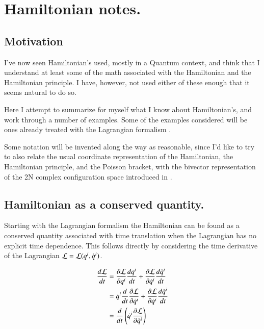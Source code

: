 

\chapter{Hamiltonian notes.}
\label{chap:hamiltonian}
{}
\date{Sept 26, 2009}

\beginArtWithToc

\section{Motivation}

I've now seen Hamiltonian's used, mostly in a Quantum context, and think that I understand at least some of the math associated with the Hamiltonian and the Hamiltonian principle.  I have, however, not used either of these enough that it seems natural to do so.

Here I attempt to summarize for myself what I know about Hamiltonian's, and work through a number of examples.  Some of the examples considered will be ones already treated with the Lagrangian formalism \cite{PJTongMf1}.

Some notation will be invented along the way as reasonable, since I'd like to try to also relate the usual coordinate representation of the Hamiltonian, the Hamiltonian principle, and the Poisson bracket, with the bivector representation of the 2N complex configuration space introduced in \cite{doran2003gap}.

\section{Hamiltonian as a conserved quantity.}

Starting with the Lagrangian formalism the Hamiltonian can be found as a conserved quantity associated with time translation when the Lagrangian has no explicit time dependence.  This follows directly by considering the time derivative of the Lagrangian $\mathcal{L} = \mathcal{L}(q^i, \dot{q}^i)$.

\begin{align*}
\frac{d\mathcal{L}}{dt} 
&= \frac{\partial {\mathcal{L}}}{\partial {q^i}} \frac{dq^i}{dt} +\frac{\partial {\mathcal{L}}}{\partial {\dot{q}^i}} \frac{d\dot{q}^i}{dt} \\
&= \dot{q}^i \frac{d}{dt}\frac{\partial {\mathcal{L}}}{\partial {\dot{q}^i}} +\frac{\partial {\mathcal{L}}}{\partial {\dot{q}^i}} \frac{d\dot{q}^i}{dt} \\
&= \frac{d}{dt} \left( \dot{q}^i \frac{\partial {\mathcal{L}}}{\partial {\dot{q}^i}} \right) 
\end{align*}

